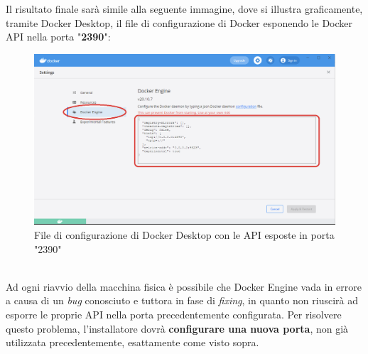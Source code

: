 Il risultato finale sarà simile alla seguente immagine, dove si illustra graficamente, tramite Docker Desktop, il file di configurazione di Docker esponendo le Docker API nella porta "\textbf{2390}":
\begin{figure}[!h]     
\centering 
    \includegraphics[width=0.7 \columnwidth]{immagini/img/docker_desktop_conf} 
    \caption{File di configurazione di Docker Desktop con le API esposte in porta "2390"}
\end{figure}\\
\newpage
Ad ogni riavvio della macchina fisica è possibile che Docker Engine vada in errore a causa di un \textit{bug} conosciuto e tuttora in fase di \textit{fixing}, in quanto non riuscirà ad esporre le proprie API nella porta precedentemente configurata. Per risolvere questo problema, l'installatore dovrà \textbf{configurare una nuova porta}, non già utilizzata precedentemente, esattamente come visto sopra.\\










